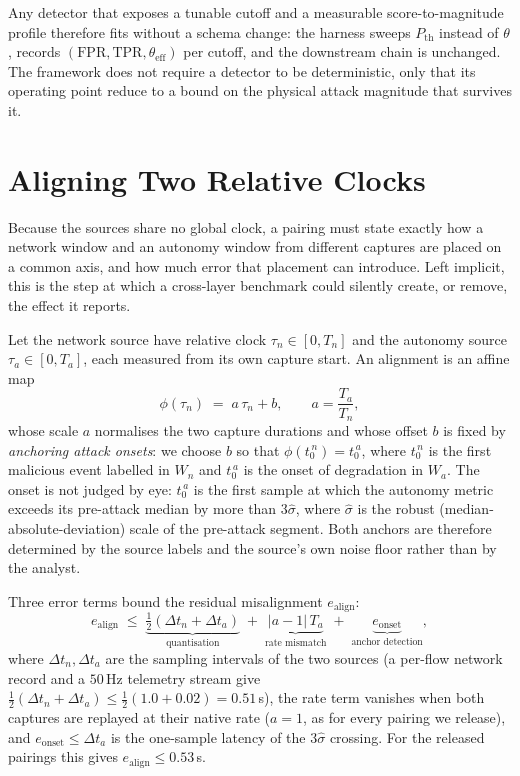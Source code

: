 Any detector that exposes a tunable cutoff and a measurable score-to-magnitude
profile therefore fits without a schema change: the harness sweeps
$P_{\mathrm{th}}$ instead of $\theta$, records
$(\mathrm{FPR},\mathrm{TPR},\theta_{\mathrm{eff}})$ per cutoff, and the
downstream chain is unchanged. The framework does not require a detector to be
deterministic, only that its operating point reduce to a bound on the physical
attack magnitude that survives it.

\section{Aligning Two Relative Clocks}
\label{app:alignment}
Because the sources share no global clock, a  pairing
must state exactly how a network window and an autonomy window from different
captures are placed on a common axis, and how much error that placement can
introduce. Left implicit, this is the step at which a cross-layer benchmark
could silently create, or remove, the effect it reports.

Let the network source have relative clock $\tau_n\in[0,T_n]$ and the autonomy
source $\tau_a\in[0,T_a]$, each measured from its own capture start. An
alignment is an affine map
\begin{equation}
\label{eq:align}
\phi(\tau_n) \;=\; a\,\tau_n + b, \qquad a=\frac{T_a}{T_n},
\end{equation}
whose scale $a$ normalises the two capture durations and whose offset $b$ is
fixed by \emph{anchoring attack onsets}: we choose $b$ so that
$\phi(t_0^{\,n}) = t_0^{\,a}$, where $t_0^{\,n}$ is the first malicious event
labelled in $W_n$ and $t_0^{\,a}$ is the onset of degradation in $W_a$. The
onset is not judged by eye: $t_0^{\,a}$ is the first sample at which the
autonomy metric exceeds its pre-attack median by more than $3\hat\sigma$, where
$\hat\sigma$ is the robust (median-absolute-deviation) scale of the pre-attack
segment. Both anchors are therefore determined by the source labels and the
source's own noise floor rather than by the analyst.

Three error terms bound the residual misalignment $e_{\mathrm{align}}$:
\begin{equation}
\label{eq:align_err}
e_{\mathrm{align}} \;\le\; \underbrace{\tfrac{1}{2}(\Delta t_n+\Delta t_a)}_{\text{quantisation}}
\;+\;\underbrace{|a-1|\,T_a}_{\text{rate mismatch}}
\;+\;\underbrace{e_{\mathrm{onset}}}_{\text{anchor detection}},
\end{equation}
where $\Delta t_n,\Delta t_a$ are the sampling intervals of the two sources (a
per-flow network record and a $50$\,Hz telemetry stream give
$\tfrac12(\Delta t_n+\Delta t_a)\le\tfrac12(1.0+0.02)=0.51$\,s), the rate term
vanishes when both captures are replayed at their native rate ($a=1$, as for
every pairing we release), and $e_{\mathrm{onset}}\le\Delta t_a$ is the
one-sample latency of the $3\hat\sigma$ crossing. For the released
 pairings this gives
$e_{\mathrm{align}}\le0.53$\,s.

